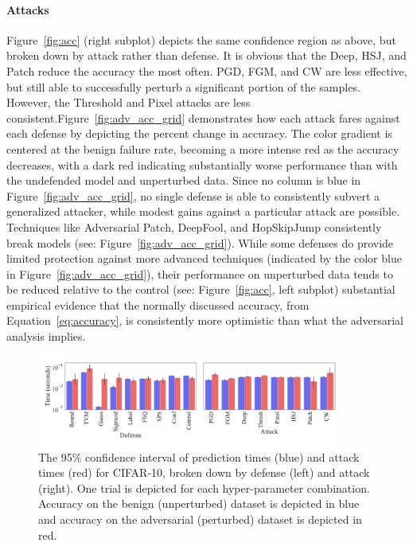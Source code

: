 \documentclass[journal]{IEEEtran}
\begin{document}
\paragraph{Attacks}
    Figure~\ref{fig:acc} (right subplot) depicts the same confidence region as above, but broken down by attack rather than defense. It is obvious that the Deep, HSJ, and Patch reduce the accuracy the most often. PGD, FGM, and CW are less effective, but still able to successfully perturb a significant portion of the samples. However, the Threshold and Pixel attacks are less consistent.Figure~\ref{fig:adv_acc_grid} demonstrates how each attack fares against each defense by depicting the percent change in accuracy. The color gradient is centered at the benign failure rate, becoming a more intense red as the accuracy decreases, with a dark red indicating substantially worse performance than with the undefended model and unperturbed data. Since no column is blue in Figure~\ref{fig:adv_acc_grid}, no single defense is able to consistently subvert a generalized attacker, while modest gains against a particular attack are possible. Techniques like Adversarial Patch, DeepFool, and HopSkipJump consistently break models (see: Figure~\ref{fig:adv_acc_grid}). While some defenses do provide limited protection against more advanced techniques (indicated by the color blue in Figure~\ref{fig:adv_acc_grid}), their performance on unperturbed data tends to be reduced relative to the control (see: Figure~\ref{fig:acc}, left subplot) substantial empirical evidence that the normally discussed accuracy, from Equation~\ref{eq:accuracy}, is consistently more optimistic than what the adversarial analysis implies.

\begin{figure}[!hptb]
    {\centering
    \includegraphics[trim={0 0.85em 0 0.35em},clip,width=0.9\textwidth]{images/cifar-10/pred_time_plot.pdf}
    \vspace{-1em}
    \caption{The 95\% confidence interval of prediction times (blue) and attack times (red) for CIFAR-10, broken down by defense (left) and attack (right). One trial is depicted for each hyper-parameter combination. Accuracy on the benign (unperturbed) dataset is depicted in blue and accuracy on the adversarial (perturbed) dataset is depicted in red.}
    \label{fig:time}
    } %
\end{figure}
\end{document}
